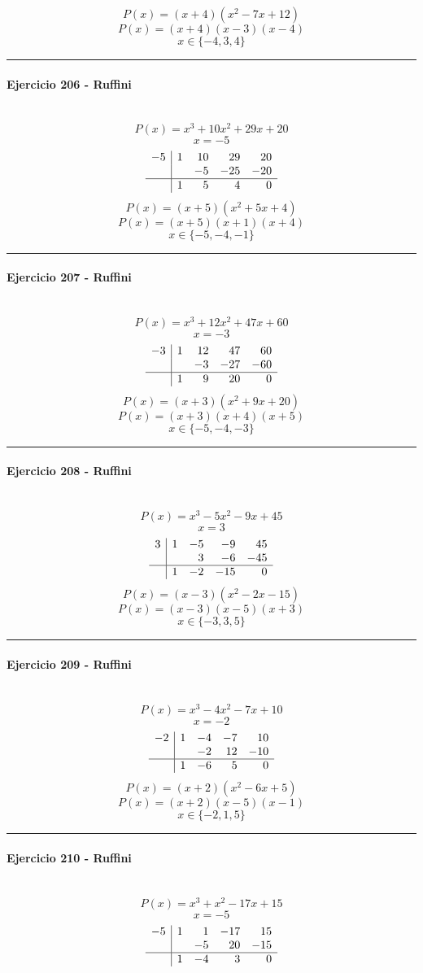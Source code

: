 \documentclass[10pt,a4paper]{article}
\newcommand{\res}[1]{\paragraph{#1}\mbox{}\\[-1.2em]}
\begin{document}
\[ P(x)=(x+4)(x^{2} - 7 x + 12) \]
\[ P(x)=(x+4)(x-3)(x-4) \]
\[ \boxed{x\in\{-4,3,4\}} \]
\vspace{1mm}\hrule\vspace{2mm}
\res{Ejercicio 206 - Ruffini}
\[ P(x)=x^{3} + 10 x^{2} + 29 x + 20 \]
\[ x=-5 \]
\[\begin{array}{r|rrrr}-5 & 1 & 10 & 29 & 20\\  &  & -5 & -25 & -20\\\hline  & 1 & 5 & 4 & 0\end{array}\]
\[ P(x)=(x+5)(x^{2} + 5 x + 4) \]
\[ P(x)=(x+5)(x+1)(x+4) \]
\[ \boxed{x\in\{-5,-4,-1\}} \]
\vspace{1mm}\hrule\vspace{2mm}
\res{Ejercicio 207 - Ruffini}
\[ P(x)=x^{3} + 12 x^{2} + 47 x + 60 \]
\[ x=-3 \]
\[\begin{array}{r|rrrr}-3 & 1 & 12 & 47 & 60\\  &  & -3 & -27 & -60\\\hline  & 1 & 9 & 20 & 0\end{array}\]
\[ P(x)=(x+3)(x^{2} + 9 x + 20) \]
\[ P(x)=(x+3)(x+4)(x+5) \]
\[ \boxed{x\in\{-5,-4,-3\}} \]
\vspace{1mm}\hrule\vspace{2mm}
\res{Ejercicio 208 - Ruffini}
\[ P(x)=x^{3} - 5 x^{2} - 9 x + 45 \]
\[ x=3 \]
\[\begin{array}{r|rrrr}3 & 1 & -5 & -9 & 45\\  &  & 3 & -6 & -45\\\hline  & 1 & -2 & -15 & 0\end{array}\]
\[ P(x)=(x-3)(x^{2} - 2 x - 15) \]
\[ P(x)=(x-3)(x-5)(x+3) \]
\[ \boxed{x\in\{-3,3,5\}} \]
\vspace{1mm}\hrule\vspace{2mm}
\res{Ejercicio 209 - Ruffini}
\[ P(x)=x^{3} - 4 x^{2} - 7 x + 10 \]
\[ x=-2 \]
\[\begin{array}{r|rrrr}-2 & 1 & -4 & -7 & 10\\  &  & -2 & 12 & -10\\\hline  & 1 & -6 & 5 & 0\end{array}\]
\[ P(x)=(x+2)(x^{2} - 6 x + 5) \]
\[ P(x)=(x+2)(x-5)(x-1) \]
\[ \boxed{x\in\{-2,1,5\}} \]
\vspace{1mm}\hrule\vspace{2mm}
\res{Ejercicio 210 - Ruffini}
\[ P(x)=x^{3} + x^{2} - 17 x + 15 \]
\[ x=-5 \]
\[\begin{array}{r|rrrr}-5 & 1 & 1 & -17 & 15\\  &  & -5 & 20 & -15\\\hline  & 1 & -4 & 3 & 0\end{array}\]
\end{document}

